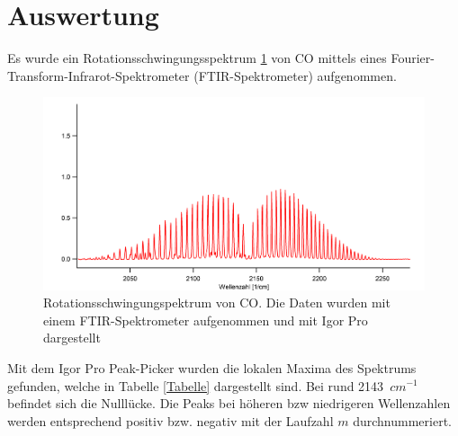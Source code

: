

\setlength\abovedisplayshortskip{20pt}
\setlength\belowdisplayshortskip{20pt}
\setlength\abovedisplayskip{20pt}
\setlength\belowdisplayskip{20pt}
\section {Auswertung}

Es wurde ein Rotationsschwingungsspektrum \ref{Spektrum} von CO mittels eines Fourier-Transform-Infrarot-Spektrometer (FTIR-Spektrometer) aufgenommen.

\begin{figure}[H]
	\centering	
	\begin{minipage}{1\textwidth}
		\includegraphics[width=\columnwidth]{Bilder/Graph_spektrum.png}
	\end{minipage}
	\caption{Rotationsschwingungspektrum von CO. Die Daten wurden mit einem FTIR-Spektrometer aufgenommen und mit Igor Pro dargestellt }
	\label{Spektrum}
\end{figure}
Mit dem Igor Pro Peak-Picker wurden die lokalen Maxima des Spektrums gefunden, welche in Tabelle \ref{Tabelle} dargestellt sind. Bei rund 2143~$cm^{-1}$ befindet sich die Nulllücke. Die Peaks bei höheren bzw niedrigeren Wellenzahlen werden entsprechend positiv bzw. negativ mit der Laufzahl $m$ durchnummeriert.

